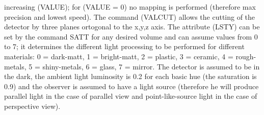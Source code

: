    increasing (VALUE); for (VALUE = 0) no mapping is performed (therefore max 
   precision and lowest speed).  The command (VALCUT) allows the cutting of 
   the detector by three planes ortogonal to the x,y,z axis. The attribute 
   (LSTY) can be set by the command SATT for any desired volume and can assume 
   values from 0 to 7; it determines the different light processing to be 
   performed for different materials:  0 = dark-matt, 1 = bright-matt, 2 = 
   plastic, 3 = ceramic, 4 = rough-metals, 5 = shiny-metals, 6 = glass, 7 = 
   mirror. The detector is assumed to be in the dark, the ambient light 
   luminosity is 0.2 for each basic hue (the saturation is 0.9) and the 
   observer is assumed to have a light source (therefore he will produce 
   parallel light in the case of parallel view and point-like-source light in 
   the case of perspective view).  


\fi


\BEGARG
{}
\ENDARG


